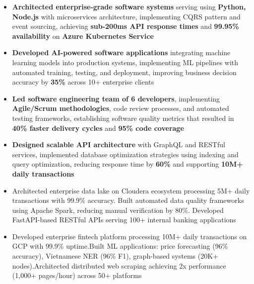 \documentclass[10pt,a4paper,ragged2e,withhyper]{altacv}
\begin{document}
\medskip

\begin{itemize}
  \item \textbf{Architected enterprise-grade software systems} serving using \textbf{Python, Node.js} with microservices architecture, implementing CQRS pattern and event sourcing, achieving \textbf{sub-200ms API response times} and \textbf{99.95\% availability} on \textbf{Azure Kubernetes Service}
  
  \item \textbf{Developed AI-powered software applications} integrating machine learning models into production systems, implementing ML pipelines with automated training, testing, and deployment, improving business decision accuracy by \textbf{35\%} across 10+ enterprise clients
  
  \item \textbf{Led software engineering team of 6 developers}, implementing \textbf{Agile/Scrum methodologies}, code review processes, and automated testing frameworks, establishing software quality metrics that resulted in \textbf{40\% faster delivery cycles} and \textbf{95\% code coverage}
  
  \item \textbf{Designed scalable API architecture} with GraphQL and RESTful services, implemented database optimization strategies using indexing and query optimization, reducing response time by \textbf{60\%} and supporting \textbf{10M+ daily transactions}
    
\end{itemize}


\begin{itemize}[leftmargin=*,noitemsep,topsep=0pt]
    \item Architected enterprise data lake on Cloudera ecosystem processing 5M+ daily transactions with 99.9\% accuracy. Built automated data quality frameworks using Apache Spark, reducing manual verification by 80\%. Developed FastAPI-based RESTful APIs serving 100+ internal banking applications
\end{itemize}

\smallskip

\begin{itemize}[leftmargin=*,noitemsep,topsep=0pt]
    \item Developed enterprise fintech platform processing 10M+ daily transactions on GCP with 99.9\% uptime.Built ML applications: price forecasting (96\% accuracy), Vietnamese NER (96\% F1), graph-based systems (20K+ nodes).Architected distributed web scraping achieving 2x performance (1,000+ pages/hour) across 50+ platforms
\end{itemize}
\end{document}
